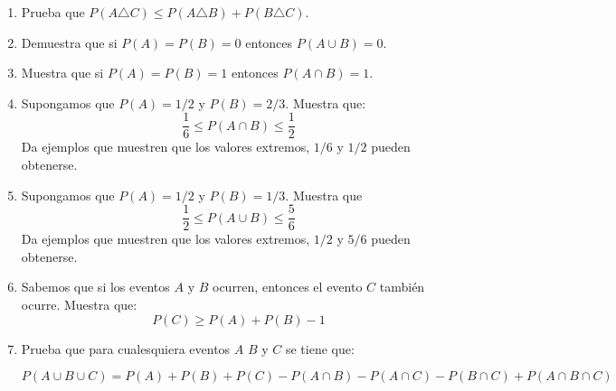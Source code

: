 \documentclass[12pt]{extreport}
\begin{document}
\begin{enumerate}
    \item Prueba que $P(A\triangle C)\leq P(A\triangle B) + P(B\triangle C)$.
    \item Demuestra que si $P(A) = P(B) = 0 $ entonces $P(A\cup B) = 0$.
    \item Muestra que si $P(A) = P(B) = 1$ entonces $P(A\cap B) = 1$.
    \item Supongamos que $P(A)= 1/2$ y $P(B)= 2/3$. Muestra que:
    $$
    \frac{1}{6} \leq P(A\cap B) \leq \frac{1}{2}
    $$
    Da ejemplos que muestren que los valores extremos, $1/6$ y $1/2$ pueden obtenerse.
    \item Supongamos que $P(A) = 1/2$ y $P(B) = 1/3$. Muestra que
    $$
    \frac{1}{2}\leq P(A\cup B)\leq \frac{5}{6}
    $$
    Da ejemplos que muestren que los valores extremos, $1/2$ y $5/6$ pueden obtenerse.

    \item Sabemos que si los eventos $A$ y $B$ ocurren, entonces el evento $C$ también ocurre. Muestra que:
    $$
    P(C) \geq P(A) + P(B) - 1
    $$ 
    \item Prueba que para cualesquiera eventos $A$ $B$ y $C$ se tiene que:

    $$
    P(A\cup B \cup C) = P(A) + P(B) + P(C) - P(A\cap B) - P(A\cap C) - P(B\cap C) + P(A\cap B\cap C)
    $$
\end{enumerate}
\end{document}
